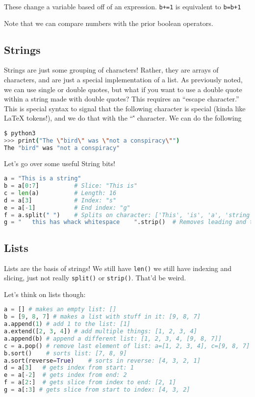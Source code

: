 \documentclass[11pt, twoside, reqno]{book}
\begin{document}
These change a variable based off of an expression. \texttt{b+=1} is equivalent to \texttt{b=b+1}

Note that we can compare numbers with the prior boolean operators.

\subsection{Strings}

Strings are just some grouping of characters! Rather, they are arrays of characters, and are just a special implementation of a list. As previously noted, we can use single or double quotes, but what if you want to use a double quote within a string made with double quotes? This requires an ``escape character.'' This is special syntax to signal that the following character is special (kinda like LaTeX tokens!), and we do that with the ``\'' character. We can do the following
\begin{lstlisting}[language=sh]
$ python3
>>> print("The \"bird\" was \"not a conspiracy\"")
The "bird" was "not a conspiracy"
\end{lstlisting}

Let's go over some useful String bits!
\begin{lstlisting}[language=Python]
a = "This is a string"
b = a[0:7]          # Slice: "This is"
c = len(a)          # Length: 16
d = a[3]            # Index: "s"
e = a[-1]           # End index: "g"
f = a.split(" ")    # Splits on character: ['This', 'is', 'a', 'string']
g = "   this has whack whitespace    ".strip()  # Removes leading and trailing whitespace
\end{lstlisting}

\subsection{Lists}

Lists are the basis of strings! We still have \texttt{len()} we still have indexing and slicing, just not really \texttt{split()} or \texttt{strip()}. That'd be weird.

Let's think on lists though:
\begin{lstlisting}[language=Python]
a = [] # makes an empty list: []
b = [9, 8, 7] # makes a list with stuff in it: [9, 8, 7]
a.append(1) # add 1 to the list: [1]
a.extend([2, 3, 4]) # add multiple things: [1, 2, 3, 4]
a.append(b) # append a different list: [1, 2, 3, 4, [9, 8, 7]]
c = a.pop() # remove last element of list: a=[1, 2, 3, 4], c=[9, 8, 7]
b.sort()    # sorts list: [7, 8, 9]
a.sort(reverse=True)    # sorts in reverse: [4, 3, 2, 1]
d = a[3]   # gets index from start: 1
e = a[-2]  # gets index from end: 2
f = a[2:]  # gets slice from index to end: [2, 1]
g = a[:3] # gets slice from start to index: [4, 3, 2]
\end{lstlisting}
\end{document}

